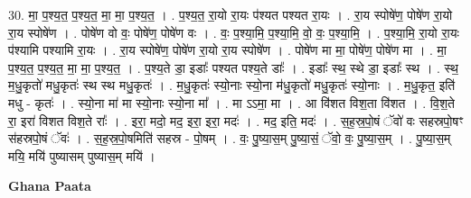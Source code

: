 \documentclass[17pt]{extarticle}
\begin{document}
30. मा॒ प॒श्य॒त॒ प॒श्य॒त॒ मा॒ मा॒ प॒श्य॒त॒ । . प॒श्य॒त॒ रा॒यो रा॒यः प॑श्यत पश्यत रा॒यः । . रा॒य स्पोषे॑ण॒ पोषे॑ण रा॒यो रा॒य स्पोषे॑ण । . पोषे॑ण वो वः॒ पोषे॑ण॒ पोषे॑ण वः । . वः॒ प॒श्या॒मि॒ प॒श्या॒मि॒ वो॒ वः॒ प॒श्या॒मि॒ । . प॒श्या॒मि॒ रा॒यो रा॒यः प॑श्यामि पश्यामि रा॒यः । . रा॒य स्पोषे॑ण॒ पोषे॑ण रा॒यो रा॒य स्पोषे॑ण । . पोषे॑ण मा मा॒ पोषे॑ण॒ पोषे॑ण मा । . मा॒ प॒श्य॒त॒ प॒श्य॒त॒ मा॒ मा॒ प॒श्य॒त॒ । . प॒श्य॒ते डा॒ इडाः᳚ पश्यत पश्य॒ते डाः᳚ । . इडाः᳚ स्थ॒ स्थे डा॒ इडाः᳚ स्थ । . स्थ॒ म॒धु॒कृतो॑ मधु॒कृतः॑ स्थ स्थ मधु॒कृतः॑ । . म॒धु॒कृतः॑ स्यो॒नाः स्यो॒ना म॑धु॒कृतो॑ मधु॒कृतः॑ स्यो॒नाः । . म॒धु॒कृत॒ इति॑ मधु - कृतः॑ । . स्यो॒ना मा॑ मा स्यो॒नाः स्यो॒ना मा᳚ । . मा ऽऽमा॒ मा । . आ वि॑शत विश॒ता वि॑शत । . वि॒श॒ते रा॒ इरा॑ विशत विश॒ते राः᳚ । . इरा॒ मदो॒ मद॒ इरा॒ इरा॒ मदः॑ । . मद॒ इति॒ मदः॑ । . स॒ह॒स्र॒पो॒षं ॅवो॑ वः सहस्रपो॒षꣳ स॑हस्रपो॒षं ॅवः॑ । . स॒ह॒स्र॒पो॒षमिति॑ सहस्र - पो॒षम् । . वः॒ पु॒ष्या॒स॒म् पु॒ष्या॒सं॒ ॅवो॒ वः॒ पु॒ष्या॒स॒म् । . पु॒ष्या॒स॒म् मयि॒ मयि॑ पुष्यासम् पुष्यास॒म् मयि॑ । \newline

\textbf{Ghana Paata } \newline
\end{document}
